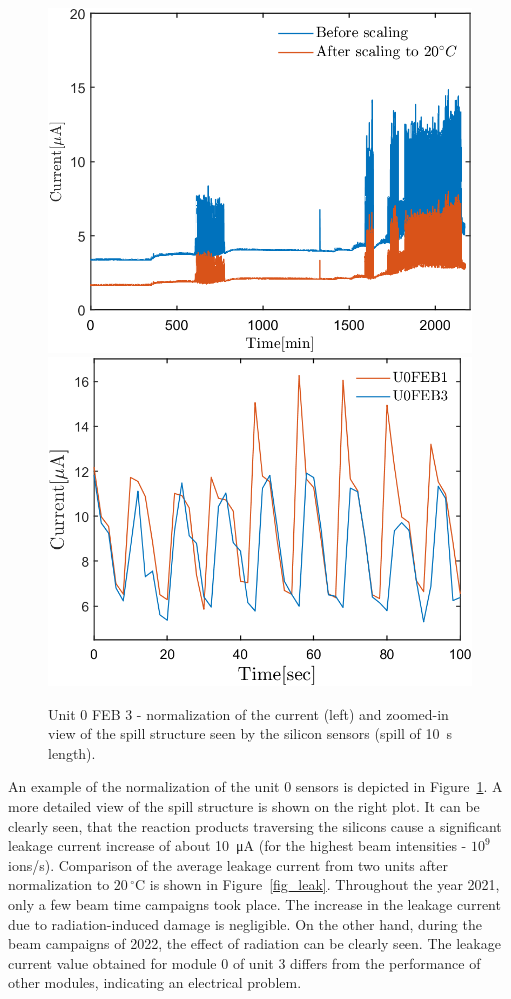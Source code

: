 \begin{figure}[!h]
\centering
\includegraphics[width=0.45\columnwidth]{Chapter6/DCS/images/uranium/current_U_highintensity.png}
\includegraphics[width=0.47\columnwidth]{Chapter6/DCS/images/uranium/U3L1_spill.png}
\caption{Unit 0 \gls{FEB} 3 - normalization of the current (left) and zoomed-in view of the spill structure seen by the silicon sensors (spill of 10~s length).}
\label{fig_sensors_spill}
\end{figure}

An example of the normalization of the unit 0 sensors is depicted in Figure~\ref{fig_sensors_spill}. A more detailed view of the spill structure is shown on the right plot. It can be clearly seen, that the reaction products traversing the silicons cause a significant leakage current increase of about \SI{10}{\micro A} (for the highest beam intensities - $10^{9}$ ions/s). Comparison of the average leakage current from two units after normalization to $20\,^{\circ}$C is shown in Figure~\ref{fig_leak}. Throughout the year 2021, only a few beam time campaigns took place. The increase in the leakage current due to radiation-induced damage is negligible. On the other hand, during the beam campaigns of 2022, the effect of radiation can be clearly seen. The leakage current value obtained for module 0 of unit 3 differs from the performance of other modules, indicating an electrical problem.

